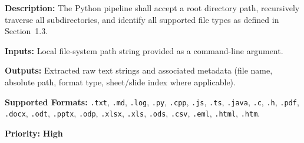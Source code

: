 \documentclass[12pt, a4paper]{article}
\begin{document}
\begin{tcolorbox}[enhanced, colback=white, colframe=ctPurple,
    colbacktitle=ctLightPurple, coltitle=ctPurple, boxrule=0.5pt,
    leftrule=4pt, arc=2mm, fonttitle=\large\bfseries,
    title={FR-1: Bulk Directory Ingestion},
    drop fuzzy shadow=black!5!white, top=2pt, bottom=2pt]
\begin{prolist}
    \item \textbf{Description:} The Python pipeline shall accept a root
    directory path, recursively traverse all subdirectories, and identify
    all supported file types as defined in Section~1.3.

    \item \textbf{Inputs:} Local file-system path string provided as a
    command-line argument.

    \item \textbf{Outputs:} Extracted raw text strings and associated
    metadata (file name, absolute path, format type, sheet/slide index
    where applicable).

    \item \textbf{Supported Formats:} \texttt{.txt}, \texttt{.md},
    \texttt{.log}, \texttt{.py}, \texttt{.cpp}, \texttt{.js}, \texttt{.ts},
    \texttt{.java}, \texttt{.c}, \texttt{.h}, \texttt{.pdf}, \texttt{.docx},
    \texttt{.odt}, \texttt{.pptx}, \texttt{.odp}, \texttt{.xlsx},
    \texttt{.xls}, \texttt{.ods}, \texttt{.csv}, \texttt{.eml},
    \texttt{.html}, \texttt{.htm}.

    \item \textbf{Priority:} \textcolor{alertRed}{\textbf{High}}
\end{prolist}
\end{tcolorbox}

\vspace{0.4cm}
\end{document}
